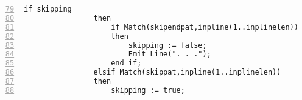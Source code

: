 \lstset{language=Ada, caption=impl.adb: Handling segments to be skipped}
\begin{tcolorbox}[width=\linewidth, sharp corners=all, colback=white!95!black]
\begin{lstlisting}[frame=single, numbers=left, numbersep=5pt, firstnumber= 79]
                if skipping
                then
                    if Match(skipendpat,inpline(1..inplinelen))
                    then
                        skipping := false;
                        Emit_Line(". . .");
                    end if;
                elsif Match(skippat,inpline(1..inplinelen))
                then
                    skipping := true;
\end{lstlisting}
\end{tcolorbox}
